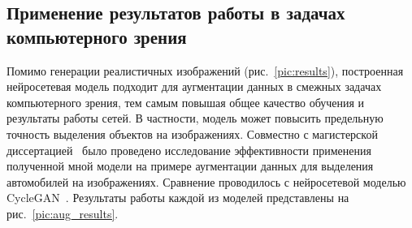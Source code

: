 \documentclass[11pt,a4paper]{extarticle}
\begin{document}
{		\subsection{Применение результатов работы в задачах компьютерного зрения}\label{sec:results:aug}

			Помимо генерации реалистичных изображений (рис.~\ref{pic:results}), построенная нейросетевая модель подходит для аугментации данных в смежных задачах компьютерного зрения, тем самым повышая общее качество обучения и результаты работы сетей.
			В частности, модель может повысить предельную точность выделения объектов на изображениях.
			\newline\newline
			Совместно с магистерской диссертацией~\cite{disser_aug} было проведено исследование эффективности применения полученной мной модели на примере аугментации данных для выделения автомобилей на изображениях.
			Сравнение проводилось с нейросетевой моделью CycleGAN~\cite{CycleGAN}. Результаты работы каждой из моделей представлены на рис.~\ref{pic:aug_results}.

}
\end{document}
